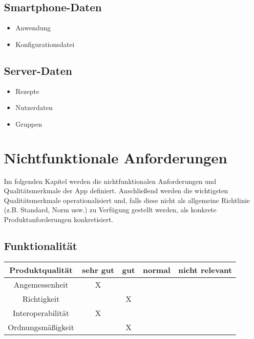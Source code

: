 \documentclass[parskip=full]{scrartcl}
\newcommand{\changelocaltocdepth}[1]{%
  \addtocontents{toc}{\protect\setcounter{tocdepth}{#1}}%
  \setcounter{tocdepth}{#1}%
}
\newcommand{\resetsubsectionnumbering}{
    \renewcommand{\thesubsection}{\arabic{section}.\arabic{subsection}}
    \changelocaltocdepth{3} 
}
\begin{document}
\subsection{Smartphone-Daten}
\begin{itemize}
    \item Anwendung
    \item Konfigurationsdatei
\end{itemize}

\subsection{Server-Daten}
\begin{itemize}
    \item Rezepte
    \item Nutzerdaten
    \item Gruppen
\end{itemize}

\resetsubsectionnumbering
\section{Nichtfunktionale Anforderungen}
Im folgenden Kapitel werden die nichtfunktionalen Anforderungen und Qualitätsmerkmale der App definiert.
Anschließend werden die wichtigsten Qualitätsmerkmale operationalisiert und, falls diese nicht als allgemeine Richtlinie (z.B. Standard, Norm usw.) zu Verfügung gestellt werden,
als konkrete Produktanforderungen konkretisiert.

\subsection{Funktionalität}
\begin{tabular}{| c | c | c | c | c |}
    \hline
    \textbf{ Produktqualität } & \textbf{sehr gut} & \textbf{gut} & \textbf{normal} & \textbf{nicht relevant} \\ \hline
    Angemessenheit             & X                 &              &                 &                         \\ \hline
    Richtigkeit                &                   & X            &                 &                         \\ \hline
    Interoperabilität          & X                 &              &                 &                         \\ \hline
    Ordnungsmäßigkeit          &                   & X            &                 &                         \\ \hline
\end{tabular}
\end{document}
